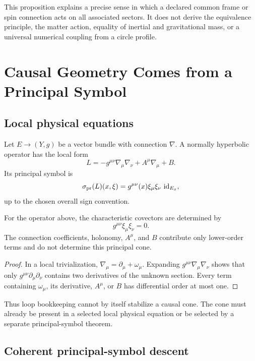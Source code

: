 \documentclass[11pt]{article}
\newcommand{\id}{\operatorname{id}}
\begin{document}
This proposition explains a precise sense in which a declared common frame or
spin connection acts on all associated sectors.  It does not derive the
equivalence principle, the matter action, equality of inertial and
gravitational mass, or a universal numerical coupling from a circle profile.

\section{Causal Geometry Comes from a Principal Symbol}

\subsection{Local physical equations}

Let $E\to(Y,g)$ be a vector bundle with connection $\nabla$.  A normally
hyperbolic operator has the local form
\[
 L
 =-g^{\mu\nu}\nabla_\mu\nabla_\nu
 +A^\mu\nabla_\mu+B.
\]
Its principal symbol is
\[
 \sigma_{\rm pr}(L)(x,\xi)
 =g^{\mu\nu}(x)\xi_\mu\xi_\nu\,\id_{E_x},
\]
up to the chosen overall sign convention.

\begin{theorem}
\label{thm:principal}
For the operator above, the characteristic covectors are determined by
\[
 g^{\mu\nu}\xi_\mu\xi_\nu=0.
\]
The connection coefficients, holonomy, $A^\mu$, and $B$ contribute only
lower-order terms and do not determine this principal cone.
\end{theorem}

\begin{proof}
In a local trivialization,
$\nabla_\mu=\partial_\mu+\omega_\mu$.  Expanding
$g^{\mu\nu}\nabla_\mu\nabla_\nu$ shows that only
$g^{\mu\nu}\partial_\mu\partial_\nu$ contains two derivatives of the
unknown section.  Every term containing $\omega_\mu$, its derivative, $A^\mu$,
or $B$ has differential order at most one.
\end{proof}

Thus loop bookkeeping cannot by itself stabilize a causal cone.  The cone must
already be present in a selected local physical equation or be selected by a
separate principal-symbol theorem.

\subsection{Coherent principal-symbol descent}
\end{document}
